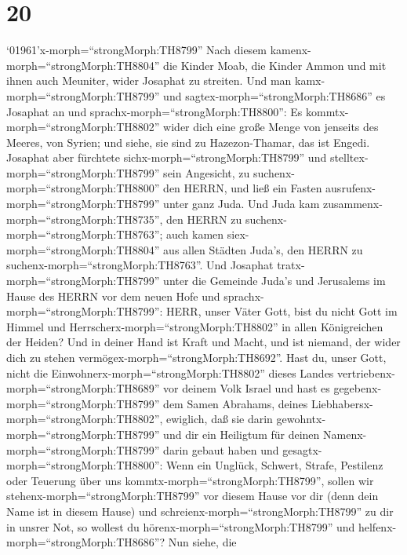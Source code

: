 \hypertarget{section-19}{%
\section{20}\label{section-19}}

 `01961'\textbar x-morph=``strongMorph:TH8799'' Nach diesem
kamenx-morph=``strongMorph:TH8804'' die Kinder Moab, die Kinder Ammon
und mit ihnen auch Meuniter, wider Josaphat zu streiten. 
Und man kamx-morph=``strongMorph:TH8799'' und
sagtex-morph=``strongMorph:TH8686'' es Josaphat an und
sprachx-morph=``strongMorph:TH8800'': Es
kommtx-morph=``strongMorph:TH8802'' wider dich eine große Menge von
jenseits des Meeres, von Syrien; und siehe, sie sind zu Hazezon-Thamar,
das ist Engedi.  Josaphat aber fürchtete
sichx-morph=``strongMorph:TH8799'' und
stelltex-morph=``strongMorph:TH8799'' sein Angesicht, zu
suchenx-morph=``strongMorph:TH8800'' den HERRN, und ließ ein Fasten
ausrufenx-morph=``strongMorph:TH8799'' unter ganz Juda.  Und
Juda kam zusammenx-morph=``strongMorph:TH8735'', den HERRN zu
suchenx-morph=``strongMorph:TH8763''; auch kamen
siex-morph=``strongMorph:TH8804'' aus allen Städten Juda's, den HERRN zu
suchenx-morph=``strongMorph:TH8763''.  Und Josaphat
tratx-morph=``strongMorph:TH8799'' unter die Gemeinde Juda's und
Jerusalems im Hause des HERRN vor dem neuen Hofe  und
sprachx-morph=``strongMorph:TH8799'': HERR, unser Väter Gott, bist du
nicht Gott im Himmel und Herrscherx-morph=``strongMorph:TH8802'' in
allen Königreichen der Heiden? Und in deiner Hand ist Kraft und Macht,
und ist niemand, der wider dich zu stehen
vermögex-morph=``strongMorph:TH8692''.  Hast du, unser Gott,
nicht die Einwohnerx-morph=``strongMorph:TH8802'' dieses Landes
vertriebenx-morph=``strongMorph:TH8689'' vor deinem Volk Israel und hast
es gegebenx-morph=``strongMorph:TH8799'' dem Samen Abrahams, deines
Liebhabersx-morph=``strongMorph:TH8802'', ewiglich,  daß sie
darin gewohntx-morph=``strongMorph:TH8799'' und dir ein Heiligtum für
deinen Namenx-morph=``strongMorph:TH8799'' darin gebaut haben und
gesagtx-morph=``strongMorph:TH8800'':  Wenn ein Unglück,
Schwert, Strafe, Pestilenz oder Teuerung über uns
kommtx-morph=``strongMorph:TH8799'', sollen wir
stehenx-morph=``strongMorph:TH8799'' vor diesem Hause vor dir (denn dein
Name ist in diesem Hause) und schreienx-morph=``strongMorph:TH8799'' zu
dir in unsrer Not, so wollest du hörenx-morph=``strongMorph:TH8799'' und
helfenx-morph=``strongMorph:TH8686''?  Nun siehe, die
